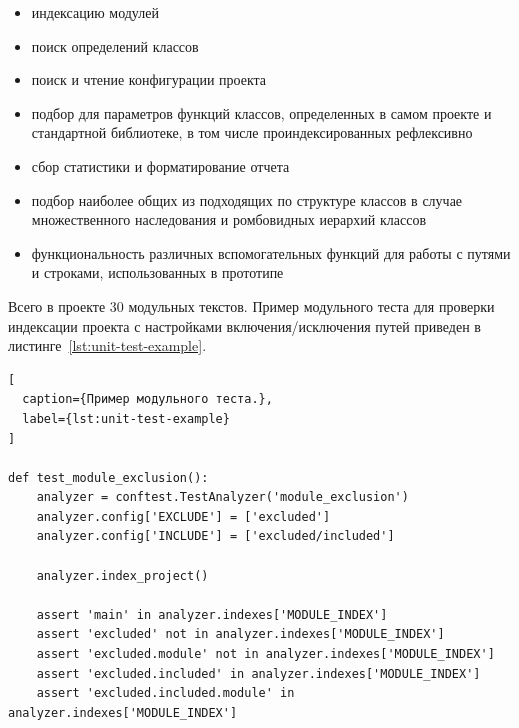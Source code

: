 \begin{itemize}
    \item индексацию модулей
    \item поиск определений классов
    \item поиск и чтение конфигурации проекта
    \item подбор для параметров функций классов, определенных в самом проекте и
      стандартной библиотеке, в том числе проиндексированных рефлексивно
    \item сбор статистики и форматирование отчета
    \item подбор наиболее общих из подходящих по структуре классов в случае
      множественного наследования и ромбовидных иерархий классов
    \item функциональность различных вспомогательных функций для работы с
      путями и строками, использованных в прототипе
\end{itemize}

Всего в проекте 30 модульных текстов. Пример модульного теста для проверки
индексации проекта с настройками включения/исключения путей приведен в
листинге~\ref{lst:unit-test-example}.

\begin{lstlisting}[
  caption={Пример модульного теста.},
  label={lst:unit-test-example}
]

def test_module_exclusion():
    analyzer = conftest.TestAnalyzer('module_exclusion')
    analyzer.config['EXCLUDE'] = ['excluded']
    analyzer.config['INCLUDE'] = ['excluded/included']

    analyzer.index_project()

    assert 'main' in analyzer.indexes['MODULE_INDEX']
    assert 'excluded' not in analyzer.indexes['MODULE_INDEX']
    assert 'excluded.module' not in analyzer.indexes['MODULE_INDEX']
    assert 'excluded.included' in analyzer.indexes['MODULE_INDEX']
    assert 'excluded.included.module' in analyzer.indexes['MODULE_INDEX']

\end{lstlisting}
